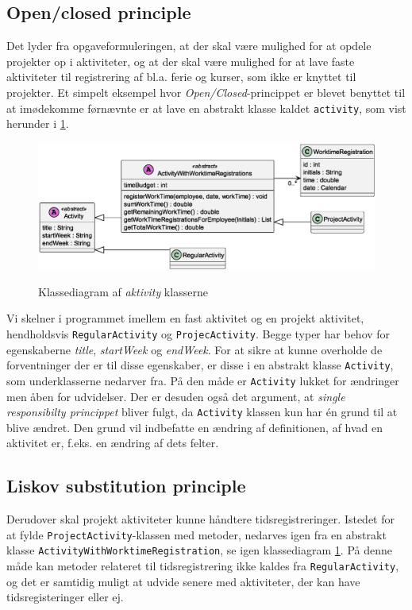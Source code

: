 \subsection{Open/closed principle} \label{sec:solid_o}
Det lyder fra opgaveformuleringen, at der skal være mulighed for at opdele projekter op i aktiviteter, og at der skal være mulighed for at lave faste aktiviteter til registrering af bl.a. ferie og kurser, som ikke er knyttet til projekter. Et simpelt eksempel hvor \textit{Open/Closed}-princippet er blevet benyttet til at imødekomme førnævnte er at lave en abstrakt klasse kaldet \texttt{activity}, som vist herunder i \cref{fig:class_activity_example}.
\begin{figure}[H]
  \centering
  \caption{Klassediagram af \textit{aktivity} klasserne}
  \includegraphics[width = 12cm]{ImplementationAndTest/Diagrams/ClassDiagrams/liskov_model_example.eps}
  \label{fig:class_activity_example}
\end{figure}
Vi skelner i programmet imellem en fast aktivitet og en projekt aktivitet, hendholdsvis \texttt{RegularActivity} og \texttt{ProjecActivity}. Begge typer har behov for egenskaberne \textit{title}, \textit{startWeek} og \textit{endWeek}. For at sikre at kunne overholde de forventninger der er til disse egenskaber, er disse i en abstrakt klasse \texttt{Activity}, som underklasserne nedarver fra. På den måde er \texttt{Activity} lukket for ændringer men åben for udvidelser.
Der er desuden også det argument, at \textit{single responsibilty princippet} bliver fulgt, da \texttt{Activity} klassen kun har én grund til at blive ændret. Den grund vil indbefatte en ændring af definitionen, af hvad en aktivitet er, f.eks. en ændring af dets felter.
\subsection{Liskov substitution principle} \label{sec:solid_l}
Derudover skal projekt aktiviteter kunne håndtere tidsregistreringer. Istedet for at fylde \texttt{ProjectActivity}-klassen med metoder, nedarves igen fra en abstrakt klasse \texttt{ActivityWithWorktimeRegistration}, se igen klassediagram \cref{fig:class_activity_example}. På denne måde kan metoder relateret til tidsregistrering ikke kaldes fra \texttt{RegularActivity}, og det er samtidig muligt at udvide senere med aktiviteter, der kan have tidsregisteringer eller ej.
